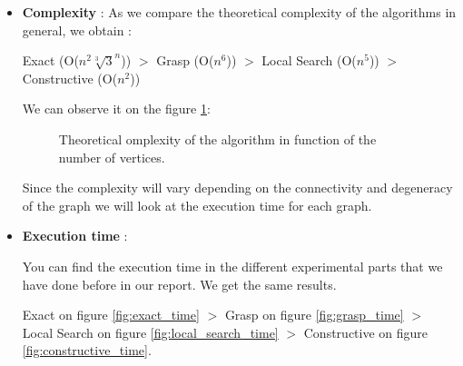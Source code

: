 \begin{itemize}
    \item \textbf{Complexity} : As we compare the theoretical complexity of the algorithms in general, we obtain : \bigskip
    
    Exact (O($n^2\sqrt[3]{3}^n$)) $>$ Grasp (O($n^6$)) $>$ Local Search (O($n^5$)) $>$ Constructive (O($n^2$)) \bigskip

    We can observe it on the figure \ref{fig:theoretical_algorithm_complexity}:

    \begin{figure}[H]
        \centering
        \caption{Theoretical omplexity of the algorithm in function of the number of vertices.}
        \label{fig:theoretical_algorithm_complexity}
    \end{figure}
    
    Since the complexity will vary depending on the connectivity and degeneracy of the graph we will look at the execution time for each graph.
    
    \item \textbf{Execution time} : \bigskip
    
    You can find the execution time in the different experimental parts that we have done before in our report. We get the same results. \bigskip
    
    Exact on figure \ref{fig:exact_time} $>$ Grasp on figure \ref{fig:grasp_time} $>$ Local Search on figure \ref{fig:local_search_time} $>$ Constructive on figure \ref{fig:constructive_time}.
\end{itemize}

